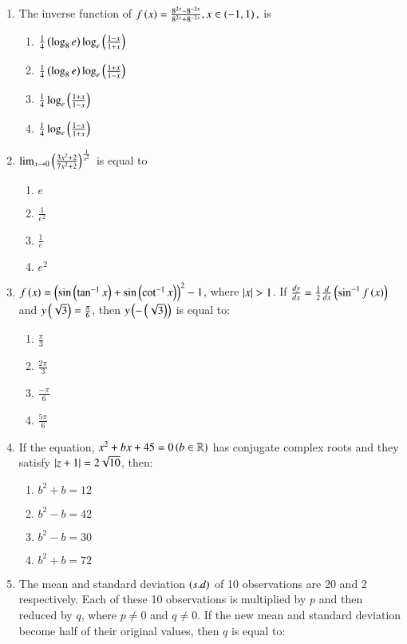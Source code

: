 \documentclass[journal,12pt,onecolumn]{IEEEtran}
\theoremstyle{remark}
\begin{document}
\begin{enumerate}
\begin{enumerate}
\end{enumerate}
\item The inverse function of $ f\left(x\right) = \frac{8^{2x} - 8^{-2x}}{8^{2x}+8^{-2x}}, x \in \left(-1,1\right), $ is 
\begin{enumerate}
    \item $\frac{1}{4}\left(\log_8 e\right)\log_e\left(\frac{1-x}{1+x}\right)$
    \item $\frac{1}{4}\left(\log_8 e\right)\log_e\left(\frac{1+x}{1-x}\right)$
    \item $\frac{1}{4}\log_e\left(\frac{1+x}{1-x}\right)$
    \item $\frac{1}{4}\log_e\left(\frac{1-x}{1+x}\right)$
\end{enumerate}
\item $\lim_{x \to 0} \left(\frac{3x^2 + 2}{7x^2 + 2}\right)^\frac{1}{x^2}$ is equal to
\begin{enumerate}
    \item $e$
    \item $\frac{1}{e^2}$
    \item $\frac{1}{e}$
    \item $e^2$
\end{enumerate}
\item $f\left(x\right) = \left( \sin\left(\tan^{-1} x\right) + \sin\left(\cot^{-1} x\right) \right)^2 - 1$, where $\left\vert x\right\vert>1$. If $\frac{dy}{dx}=\frac{1}{2} \frac{d}{dx}\left(\sin^{-1} f\left(x\right)\right)$ and $y\left(\sqrt{3}\right)=\frac{\pi}{6}$, then $y\left(-\left(\sqrt{3}\right)\right)$ is equal to:
\begin{enumerate}
    \item $\frac{\pi}{3}$
    \item $\frac{2\pi}{3}$
    \item $\frac{-\pi}{6}$
    \item $\frac{5\pi}{6}$
\end{enumerate}
\item If the equation, $x^2 + bx + 45 =0 \left(b \in \mathbb{R}\right)$ has conjugate complex roots and they satisfy $\left\vert z + 1\right\vert = 2\sqrt{10}$, then:
\begin{enumerate}
    \item $b^2 + b = 12$
    \item $b^2 - b = 42$
    \item $b^2 - b = 30$
    \item $b^2 + b = 72$
\end{enumerate}
\item The mean and standard deviation $\left(s.d\right)$ of 10 observations are 20 and 2 respectively. Each of these 10 observations is multiplied by $p$ and then reduced by $q$, where $p\neq0$ and $q\neq0$. If the new mean and standard deviation become half of their original values, then $q$ is equal to:

\end{enumerate}
\end{document}
